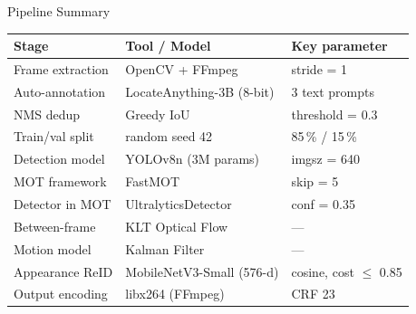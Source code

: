 \documentclass[aspectratio=169]{beamer}
\begin{document}
\begin{frame}{Pipeline Summary}
\begin{center}
\small
\begin{tabular}{lll}
\toprule
\textbf{Stage}       & \textbf{Tool / Model}          & \textbf{Key parameter} \\
\midrule
Frame extraction   & OpenCV + FFmpeg                & stride = 1 \\
Auto-annotation    & LocateAnything-3B (8-bit)      & 3 text prompts \\
NMS dedup          & Greedy IoU                     & threshold = 0.3 \\
Train/val split    & random seed 42                 & 85\,\% / 15\,\% \\
Detection model    & YOLOv8n (3M params)            & imgsz = 640 \\
MOT framework      & FastMOT                        & skip = 5 \\
Detector in MOT    & UltralyticsDetector            & conf = 0.35 \\
Between-frame      & KLT Optical Flow               & — \\
Motion model       & Kalman Filter                  & — \\
Appearance ReID    & MobileNetV3-Small (576-d)      & cosine, cost $\leq$ 0.85 \\
Output encoding    & libx264 (FFmpeg)               & CRF 23 \\
\bottomrule
\end{tabular}
\end{center}
\end{frame}
\end{document}
